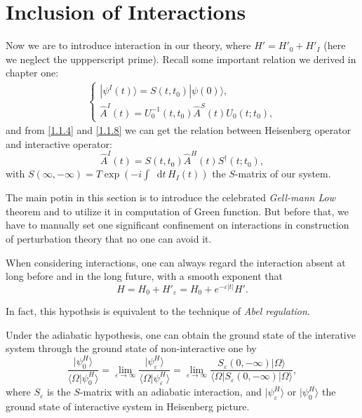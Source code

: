 \documentclass[b5paper,10pt,UTF8]{book}
\newcommand*\dd{\mathop{}\!\mathrm{d}}
\numberwithin{equation}{section}
\begin{document}
	\section{Inclusion of Interactions}
		Now we are to introduce interaction in our theory, where $H'=H'_0+H'_I$ (here we neglect the uppperscript prime). Recall some important relation we derived in chapter one:
		\begin{align*}
			\begin{cases}
				|\psi^I(t)\rangle=S(t,t_0)|\psi(0)\rangle,\\
				\hat{A}^I(t)=U_0^{-1}(t,t_0)\hat{A}^S(t) U_0(t;t_0),
			\end{cases}
		\end{align*}
		and from \eqref{1.1.4} and \eqref{1.1.8} we can get the relation between Heisenberg operator and interactive operator:
		\begin{equation}\label{2.6.0}
			\hat{A}^I(t)=S(t,t_0)\hat{A}^H(t) S^\dagger(t;t_0),
		\end{equation}
		with $\displaystyle S(\infty,-\infty)=T\exp\left(-i\int\dd t\,H_I(t)\right)$ the $S$-matrix of our system.\par
		The main potin in this section is to introduce the celebrated \emph{Gell-mann Low} theorem and to utilize it in computation of Green function. But before that, we have to manually set one significant confinement on interactions in construction of perturbation theory that no one can avoid it.
		\begin{Hypothesis}
			When considering interactions, one can always regard the interaction absent at long before and in the long future, with a smooth exponent that 
			\begin{equation}\label{2.6.1}
				H=H_0+H'_\varepsilon=H_0+e^{-\varepsilon|t|}H'.
			\end{equation}
		\end{Hypothesis}
		\begin{Note}
			In fact, this hypothsis is equivalent to the technique of \emph{Abel regulation}.
		\end{Note}
		\begin{Theorem}
			Under the adiabatic hypothesis, one can obtain the ground state of the interative system through the ground state of non-interactive one by
			\begin{equation}\label{2.6.2}
				\dfrac{|\psi^H_0\rangle}{\langle\Omega|\psi^H_0\rangle}=\lim_{\varepsilon\rightarrow\infty}\dfrac{|\psi^H_\varepsilon\rangle}{\langle\Omega|\psi^H_\varepsilon\rangle}=\lim_{\varepsilon\rightarrow\infty}\dfrac{S_\varepsilon(0,-\infty)|\Omega\rangle}{\langle\Omega|S_\varepsilon(0,-\infty)|\Omega\rangle},
			\end{equation}
			where $S_\varepsilon$ is the $S$-matrix with an adiabatic interaction, and $|\psi^H_\varepsilon\rangle$ or $|\psi^H_0\rangle$ the ground state of interactive system in Heisenberg picture.
		\end{Theorem}
\end{document}
